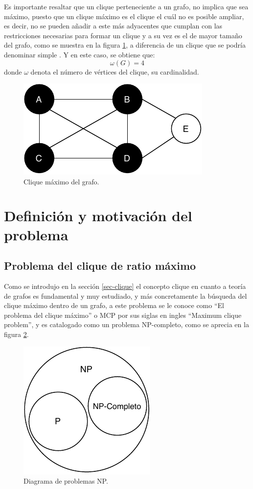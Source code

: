 Es importante resaltar que un clique perteneciente a un grafo, no implica que sea máximo, puesto que un clique máximo es el clique el cuál no es posible ampliar, es decir, no se pueden añadir a este más adyacentes que cumplan con las restricciones necesarias para formar un clique y a su vez es el de mayor tamaño del grafo, como se muestra en la figura \ref{fig:max-clique}, a diferencia de un clique que se podría denominar simple  \cite{web-maximalclique}\cite{web-maximumclique}. Y en este  caso, se obtiene que:
\[
\omega(G) = 4
\]
donde $\omega$ denota el número de vértices del clique, su cardinalidad.
\begin{figure}[H]
	\centering
	\includegraphics{Figures/graph-clique-max.pdf}
	\caption{Clique máximo del grafo.}
	\label{fig:max-clique}
\end{figure}

\section{Definición y motivación del problema}

\subsection{Problema del clique de ratio máximo}
\label{intro-problema}
Como se introdujo en la sección \ref{sec-clique} el concepto clique en cuanto a teoría de grafos es fundamental y muy estudiado, y más concretamente la búsqueda del clique máximo dentro de un grafo, a este problema se le conoce como ``El problema del clique máximo'' o \gls{MCP} por sus siglas en ingles ``Maximum clique problem'', y es catalogado como un problema NP-completo, como se aprecia en la figura \ref{fig:problemas-np}.

\begin{figure}[H]
	\centering
	\includegraphics{Figures/problemas-np.pdf}
	\caption{Diagrama de problemas NP.}
	\label{fig:problemas-np}
\end{figure}

